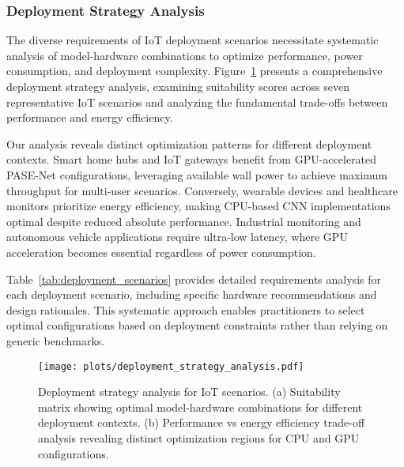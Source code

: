 

\subsubsection{Deployment Strategy Analysis}

The diverse requirements of IoT deployment scenarios necessitate systematic analysis of model-hardware combinations to optimize performance, power consumption, and deployment complexity. Figure~\ref{fig:deployment_strategy} presents a comprehensive deployment strategy analysis, examining suitability scores across seven representative IoT scenarios and analyzing the fundamental trade-offs between performance and energy efficiency.

Our analysis reveals distinct optimization patterns for different deployment contexts. Smart home hubs and IoT gateways benefit from GPU-accelerated PASE-Net configurations, leveraging available wall power to achieve maximum throughput for multi-user scenarios. Conversely, wearable devices and healthcare monitors prioritize energy efficiency, making CPU-based CNN implementations optimal despite reduced absolute performance. Industrial monitoring and autonomous vehicle applications require ultra-low latency, where GPU acceleration becomes essential regardless of power consumption.

Table~\ref{tab:deployment_scenarios} provides detailed requirements analysis for each deployment scenario, including specific hardware recommendations and design rationales. This systematic approach enables practitioners to select optimal configurations based on deployment constraints rather than relying on generic benchmarks.

\begin{figure}[t]
\centering
\texttt{[image: plots/deployment\_strategy\_analysis.pdf]}
\caption{Deployment strategy analysis for IoT scenarios. (a) Suitability matrix showing optimal model-hardware combinations for different deployment contexts. (b) Performance vs energy efficiency trade-off analysis revealing distinct optimization regions for CPU and GPU configurations.}
\label{fig:deployment_strategy}
\end{figure}

